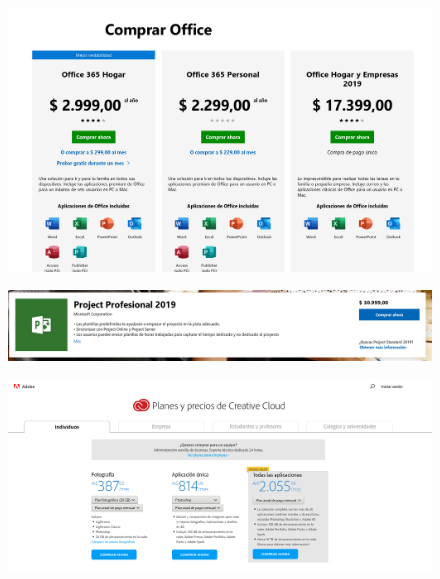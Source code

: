 \documentclass{fancyslides}
\begin{document}
\begin{frame}
	\begin{figure}
		\centering
		\includegraphics[width=1\linewidth]{images/precio_ms_office}
		\caption{}
		\label{fig:preciomsoffice}
	\end{figure}
\end{frame}

\begin{frame}
	\begin{figure}
		\centering
		\includegraphics[width=1\linewidth]{images/precio_ms_project}
		\caption{}
		\label{fig:preciomsproject}
	\end{figure}
	
\end{frame}

\begin{frame}
	\begin{figure}
		\centering
		\includegraphics[width=1\linewidth]{images/adobe}
		\caption{}
		\label{fig:adobe}
	\end{figure}
\end{frame}
\end{document}
